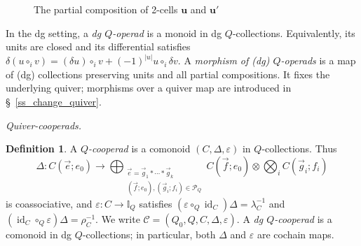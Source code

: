 \documentclass[11pt,letterpaper]{article}
\numberwithin{equation}{section}
\theoremstyle{plain}
\theoremstyle{definition}
\newtheorem{defn}[thm]{Definition}
\theoremstyle{remark}
\newcommand{\id}{\operatorname{id}}
\begin{document}
\begin{figure}[ht]
		\caption{The partial composition of 2-cells $\mathbf u$ and $\mathbf u'$}
		\label{fig:2_cell_composition}
	\end{figure}



In the dg setting, a \textit{dg $Q$-operad} is a monoid in dg $Q$-collections.
Equivalently, its units are closed and its differential satisfies
$ \delta(u\circ_i v)=(\delta u)\circ_i v
                  +(-1)^{|u|}u\circ_i\delta v$.
A \textit{morphism of (dg) $Q$-operads} is a map of (dg) collections preserving
units and all partial compositions. It fixes the underlying quiver;
morphisms over a quiver map are introduced in
\S~\ref{ss_change_quiver}.

\medskip
\noindent\textit{Quiver-cooperads.}
\begin{defn}\label{defn_E_cooperad}
A \textit{$Q$-cooperad} is a comonoid $(C,\Delta,\varepsilon)$ in
$Q$-collections. Thus
\begin{equation*} \Delta:C(\vec e;e_0)\longrightarrow
 \bigoplus_{\substack{\vec e=\vec g_1*\cdots*\vec g_k\\
 (\vec f;e_0),(\vec g_i;f_i)\in\mathcal P_Q}}
 C(\vec f;e_0)\otimes\bigotimes_i C(\vec g_i;f_i)
\end{equation*}
is coassociative, and $\varepsilon:C\to\mathbb I_Q$ satisfies
$(\varepsilon\circ_Q\id_C)\Delta=\lambda_C^{-1}$ and
$(\id_C\circ_Q\varepsilon)\Delta=\rho_C^{-1}$.
We write $\mathscr C=(Q_0,Q,C,\Delta,\varepsilon)$.
A \textit{dg $Q$-cooperad} is a comonoid in dg $Q$-collections;
in particular, both $\Delta$ and $\varepsilon$ are cochain maps.
\end{defn}
\end{document}
